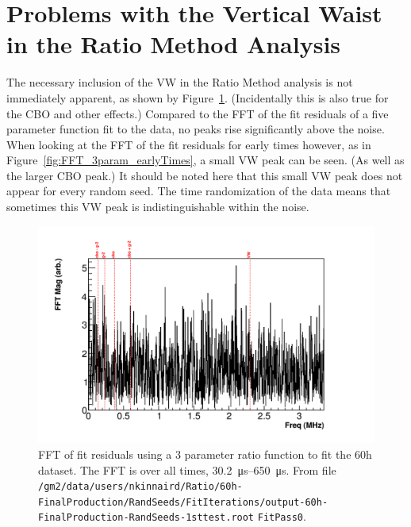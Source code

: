\documentclass[12pt,letterpaper]{report}
\newcommand{\figref}[1]{Figure~\ref{#1}}
\begin{document}
\section*{Problems with the Vertical Waist in the Ratio Method Analysis}


The necessary inclusion of the VW in the Ratio Method analysis is not immediately apparent, as shown by \figref{fig:FFT_3param_allTimes}. (Incidentally this is also true for the CBO and other effects.) Compared to the FFT of the fit residuals of a five parameter function fit to the data, no peaks rise significantly above the noise. When looking at the FFT of the fit residuals for early times however, as in \figref{fig:FFT_3param_earlyTimes}, a small VW peak can be seen. (As well as the larger CBO peak.) It should be noted here that this small VW peak does not appear for every random seed. The time randomization of the data means that sometimes this VW peak is indistinguishable within the noise. 


\begin{figure}[]
    \centering
    \includegraphics[width=\textwidth]{FFT_3param_allTimes}
    \caption[]{FFT of fit residuals using a 3 parameter ratio function to fit the 60h dataset. The FFT is over all times, \SIrange{30.2}{650}{\micro s}. From file \texttt{/gm2/data/users/nkinnaird/Ratio/60h-FinalProduction/RandSeeds/FitIterations/output-60h-FinalProduction-RandSeeds-1sttest.root} \texttt{FitPass0}.}
    \label{fig:FFT_3param_allTimes}
\end{figure}
\end{document}
